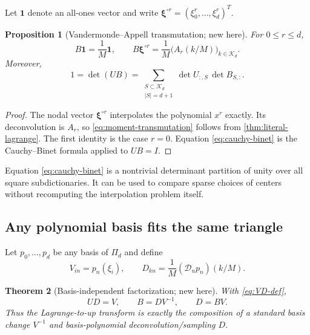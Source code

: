 \documentclass[11pt]{article}
\newtheorem{theorem}{Theorem}[section]
\newtheorem{proposition}[theorem]{Proposition}
\theoremstyle{definition}
\theoremstyle{remark}
\newcommand{\Dscr}{\mathscr D_{u}}
\newcommand{\PiD}{\Pi_d}
\begin{document}
Let $\bm 1$ denote an all-ones vector and write
$\bm\xi^{\circ r}=(\xi_0^r,\ldots,\xi_d^r)^T$.

\begin{proposition}[Vandermonde--Appell transmutation; new here]
\label{prop:moment-transmutation}
For $0\le r\le d$,
\begin{equation}
 B\bm 1=\frac1M\bm 1,
 \qquad
 B\bm\xi^{\circ r}
 =\frac1M\bigl(A_r(k/M)\bigr)_{k\in\mathcal K_d}.
 \label{eq:moment-transmutation}
\end{equation}
Moreover,
\begin{equation}
 1=\det(UB)=
 \sum_{\substack{S\subset\mathcal K_d\\|S|=d+1}}
 \det U_{:,S}\,\det B_{S,:}.
 \label{eq:cauchy-binet}
\end{equation}
\end{proposition}

\begin{proof}
The nodal vector $\bm\xi^{\circ r}$ interpolates the polynomial $x^r$ exactly.
Its deconvolution is $A_r$, so \eqref{eq:moment-transmutation} follows from
\cref{thm:literal-lagrange}.  The first identity is the case $r=0$.
Equation \eqref{eq:cauchy-binet} is the Cauchy--Binet formula applied to
$UB=I$.
\end{proof}

Equation \eqref{eq:cauchy-binet} is a nontrivial determinant partition of
unity over all square subdictionaries.  It can be used to compare sparse
choices of centers without recomputing the interpolation problem itself.

\subsection{Any polynomial basis fits the same triangle}

Let $p_0,\ldots,p_d$ be any basis of $\PiD$ and define
\begin{equation}
 V_{in}=p_n(\xi_i),
 \qquad
 D_{kn}=\frac1M(\Dscr p_n)(k/M).
 \label{eq:VD-def}
\end{equation}

\begin{theorem}[Basis-independent factorization; new here]
\label{thm:basis-factorization}
With \eqref{eq:VD-def},
\begin{equation}
 UD=V,
 \qquad
 B=DV^{-1},
 \qquad
 D=BV.
 \label{eq:basis-factorization}
\end{equation}
Thus the Lagrange-to-up transform is exactly the composition of a standard
basis change $V^{-1}$ and basis-polynomial deconvolution/sampling $D$.
\end{theorem}
\end{document}
